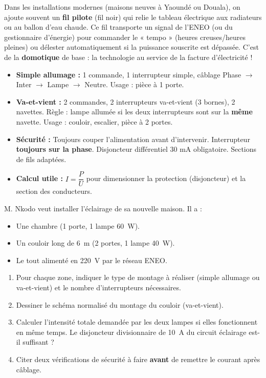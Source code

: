 \documentclass[11pt]{article}
\begin{document}
\begin{savaistu}
Dans les installations modernes (maisons neuves à Yaoundé ou Douala), on ajoute souvent un \textbf{fil pilote} (fil noir) qui relie le tableau électrique aux radiateurs ou au ballon d'eau chaude. Ce fil transporte un signal de l'ENEO (ou du gestionnaire d'énergie) pour commander le « tempo » (heures creuses/heures pleines) ou délester automatiquement si la puissance souscrite est dépassée. C'est de la \textbf{domotique} de base : la technologie au service de la facture d'électricité !
\end{savaistu}

\begin{aretenir}
\begin{itemize}
\item \textbf{Simple allumage :} 1 commande, 1 interrupteur simple, câblage Phase $\rightarrow$ Inter $\rightarrow$ Lampe $\rightarrow$ Neutre. Usage : pièce à 1 porte.
\item \textbf{Va-et-vient :} 2 commandes, 2 interrupteurs va-et-vient (3 bornes), 2 navettes. Règle : lampe allumée si les deux interrupteurs sont sur la \textbf{même} navette. Usage : couloir, escalier, pièce à 2 portes.
\item \textbf{Sécurité :} Toujours couper l'alimentation avant d'intervenir. Interrupteur \textbf{toujours sur la phase}. Disjoncteur différentiel 30 mA obligatoire. Sections de fils adaptées.
\item \textbf{Calcul utile :} $I = \dfrac{P}{U}$ pour dimensionner la protection (disjoncteur) et la section des conducteurs.
\end{itemize}
\end{aretenir}

\begin{exercice}
M. Nkodo veut installer l'éclairage de sa nouvelle maison. Il a :
\begin{itemize}
\item Une chambre (1 porte, 1 lampe \SI{60}{W}).
\item Un couloir long de \SI{6}{m} (2 portes, 1 lampe \SI{40}{W}).
\item Le tout alimenté en \SI{220}{V} par le réseau ENEO.
\end{itemize}
\begin{enumerate}
\item Pour chaque zone, indiquer le type de montage à réaliser (simple allumage ou va-et-vient) et le nombre d'interrupteurs nécessaires.
\item Dessiner le schéma normalisé du montage du couloir (va-et-vient).
\item Calculer l'intensité totale demandée par les deux lampes si elles fonctionnent en même temps. Le disjoncteur divisionnaire de \SI{10}{A} du circuit éclairage est-il suffisant ?
\item Citer deux vérifications de sécurité à faire \textbf{avant} de remettre le courant après câblage.
\end{enumerate}
\end{exercice}
\end{document}
